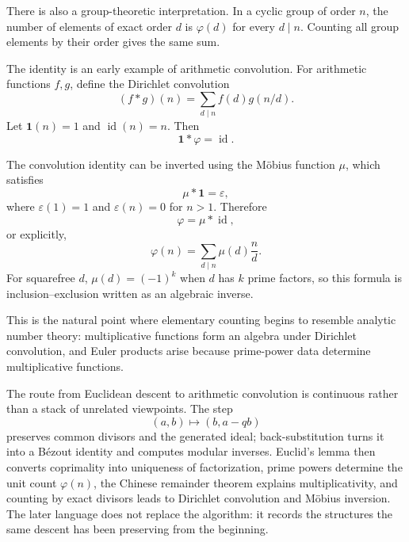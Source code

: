There is also a group-theoretic interpretation.  In a cyclic group of order \(n\), the number of elements of exact order \(d\) is \(\varphi(d)\) for every \(d\mid n\).  Counting all group elements by their order gives the same sum.

The identity is an early example of arithmetic convolution.  For arithmetic functions \(f,g\), define the Dirichlet convolution
\[
  (f*g)(n)=\sum_{d\mid n}f(d)g(n/d).
\]
Let \(\mathbf 1(n)=1\) and \(\operatorname{id}(n)=n\).  Then
\[
  \mathbf 1*\varphi=\operatorname{id}.
\]

The convolution identity can be inverted using the Möbius function \(\mu\), which satisfies
\[
  \mu*\mathbf 1=\varepsilon,
\]
where \(\varepsilon(1)=1\) and \(\varepsilon(n)=0\) for \(n>1\).  Therefore
\[
  \varphi=\mu*\operatorname{id},
\]
or explicitly,
\[
  \varphi(n)
  =\sum_{d\mid n}\mu(d)\frac nd.
\]
For squarefree \(d\), \(\mu(d)=(-1)^k\) when \(d\) has \(k\) prime factors, so this formula is inclusion--exclusion written as an algebraic inverse.

This is the natural point where elementary counting begins to resemble analytic number theory: multiplicative functions form an algebra under Dirichlet convolution, and Euler products arise because prime-power data determine multiplicative functions.

The route from Euclidean descent to arithmetic convolution is continuous rather than a stack of unrelated viewpoints.  The step
\[
  (a,b)\longmapsto(b,a-qb)
\]
preserves common divisors and the generated ideal; back-substitution turns it into a Bézout identity and computes modular inverses.  Euclid's lemma then converts coprimality into uniqueness of factorization, prime powers determine the unit count \(\varphi(n)\), the Chinese remainder theorem explains multiplicativity, and counting by exact divisors leads to Dirichlet convolution and Möbius inversion.  The later language does not replace the algorithm: it records the structures the same descent has been preserving from the beginning.
